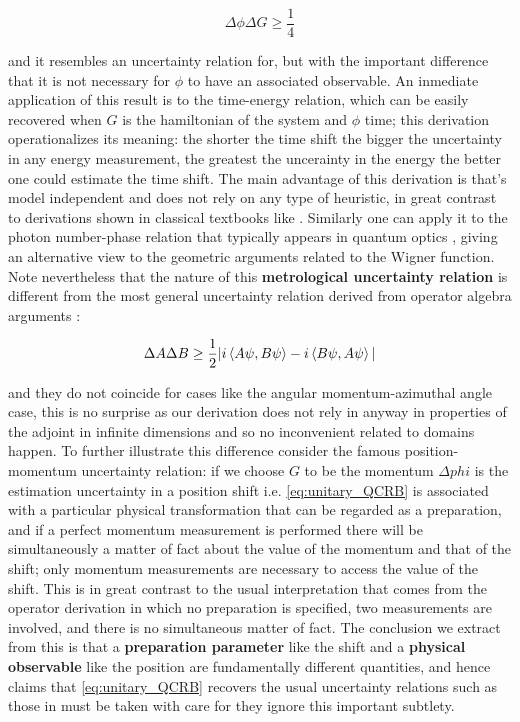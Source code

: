 \begin{equation}\label{eq:unitary_QCRB}
  \Delta \phi \Delta G\geq \frac{1}{4}
\end{equation}

and it resembles an uncertainty relation for, but with the
important difference that it is not necessary for $\phi$ to have
an associated observable. An inmediate application of this
result is to the time-energy relation, which can be easily
recovered when $G$ is the hamiltonian of the system
and $\phi$ time; this derivation operationalizes its meaning:
the shorter the time shift the bigger the uncertainty in any
energy measurement, the greatest the uncerainty in the energy the better one could estimate the time shift. The main advantage of this
derivation is that's model independent and does not rely on any type of heuristic, in great contrast to derivations shown in classical
textbooks like \cite{cohen1986quantum,sakurai2020modern}. Similarly one can apply it to the photon number-phase relation that typically
appears in quantum optics \cite{loudon_quantum_2010}, giving an alternative view to the geometric arguments related to the Wigner function.
Note nevertheless that the nature of this \textbf{metrological uncertainty relation} is different from the most general uncertainty relation
derived from operator algebra arguments \cite{gieres2000mathematical}:

\begin{equation}
\Delta A \Delta B \geq \frac{1}{2}|i\braket{A\psi, B\psi} - i\braket{B\psi,A\psi}|
\end{equation}

and they do not coincide for cases like the angular momentum-azimuthal angle case, this is no surprise as our derivation does not rely in
anyway in properties of the adjoint in infinite dimensions and so no inconvenient related to domains happen. To further illustrate this
difference consider the famous position-momentum uncertainty relation: if we choose $G$ to be the momentum $\Delta phi$ is
the estimation uncertainty in a position shift i.e. \eqref{eq:unitary_QCRB} is associated with a particular physical transformation that
can be regarded as a preparation, and if a perfect momentum measurement is performed there will be simultaneously a matter of fact about the
value of the momentum and that of the shift; only momentum measurements are necessary to access the value of the shift.
This is in great contrast to the usual interpretation that comes from the operator derivation in which no preparation is specified, two
measurements are involved, and there is no simultaneous matter of fact. The conclusion we extract from this is that a \textbf{preparation
  parameter} like the shift and a \textbf{physical observable} like the position are fundamentally different quantities, and hence claims
that \eqref{eq:unitary_QCRB} recovers the usual uncertainty relations such as those in \cite{wiseman_quantum_2010} must be taken with care for
they ignore this important subtlety.

